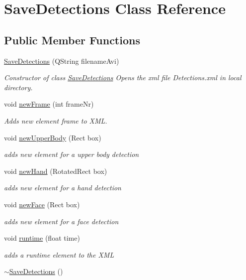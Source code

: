 \hypertarget{class_save_detections}{\section{Save\-Detections Class Reference}
\label{class_save_detections}
}
\subsection*{Public Member Functions}
\begin{DoxyCompactItemize}
\item 
\hyperlink{class_save_detections_a3583bd8066410a896ca4fb2891ea08ef}{Save\-Detections} (Q\-String filename\-Avi)
\begin{DoxyCompactList}\small\item\em Constructor of class \hyperlink{class_save_detections}{Save\-Detections} Opens the xml file Detections.\-xml in local directory. \end{DoxyCompactList}\item 
void \hyperlink{class_save_detections_a5a0112af80a6f2c7e5e0c12c757e3da9}{new\-Frame} (int frame\-Nr)
\begin{DoxyCompactList}\small\item\em Adds new element frame to X\-M\-L. \end{DoxyCompactList}\item 
void \hyperlink{class_save_detections_acb1e8a18ffa4410a638a47c32314839e}{new\-Upper\-Body} (Rect box)
\begin{DoxyCompactList}\small\item\em adds new element for a upper body detection \end{DoxyCompactList}\item 
void \hyperlink{class_save_detections_a7b88edb6590edbef9afced3d94c05bf8}{new\-Hand} (Rotated\-Rect box)
\begin{DoxyCompactList}\small\item\em adds new element for a hand detection \end{DoxyCompactList}\item 
void \hyperlink{class_save_detections_a0326a59a4ce799b4be3016a65946dfcd}{new\-Face} (Rect box)
\begin{DoxyCompactList}\small\item\em adds new element for a face detection \end{DoxyCompactList}\item 
void \hyperlink{class_save_detections_a6bc172c27da2231a4677c73efb967946}{runtime} (float time)
\begin{DoxyCompactList}\small\item\em adds a runtime element to the X\-M\-L \end{DoxyCompactList}\item 
\hypertarget{class_save_detections_a0dbc57c6c8ea4096bce1e4b640d697eb}{\hyperlink{class_save_detections_a0dbc57c6c8ea4096bce1e4b640d697eb}{$\sim$\-Save\-Detections} ()}\label{class_save_detections_a0dbc57c6c8ea4096bce1e4b640d697eb}


\end{DoxyCompactItemize}
